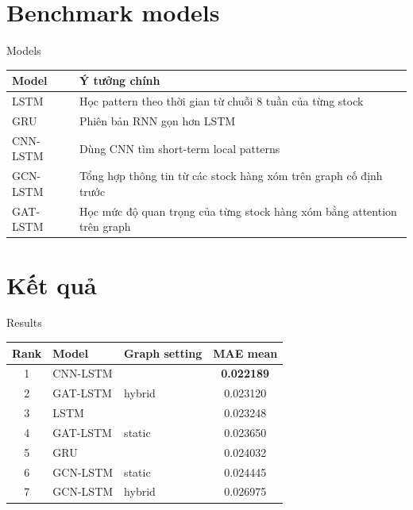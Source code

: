 \documentclass[aspectratio=169,11pt,t]{beamer}
\begin{document}
\section{Benchmark models}
\begin{frame}{Models}
\small
\begin{tabularx}{\textwidth}{@{}lX@{}}
\toprule
\textbf{Model} & \textbf{Ý tưởng chính} \\
\midrule
LSTM & Học pattern theo thời gian từ chuỗi 8 tuần của từng stock \\
GRU & Phiên bản RNN gọn hơn LSTM \\
CNN-LSTM & Dùng CNN tìm short-term local patterns \\
GCN-LSTM & Tổng hợp thông tin từ các stock hàng xóm trên graph cố định trước \\
GAT-LSTM & Học mức độ quan trọng của từng stock hàng xóm bằng attention trên graph \\
\bottomrule
\end{tabularx}

\end{frame}

\section{Kết quả}
\begin{frame}{Results}
\small
\centering
\begin{tabular}{@{}cllc@{}}
\toprule
\textbf{Rank} & \textbf{Model} & \textbf{Graph setting} & \textbf{MAE mean} \\
\midrule
1 & CNN-LSTM &  & \textbf{0.022189} \\
2 & GAT-LSTM & hybrid & 0.023120 \\
3 & LSTM &  & 0.023248 \\
4 & GAT-LSTM & static & 0.023650 \\
5 & GRU &  & 0.024032 \\
6 & GCN-LSTM & static & 0.024445 \\
7 & GCN-LSTM & hybrid & 0.026975 \\
\bottomrule
\end{tabular}

\end{frame}
\end{document}
